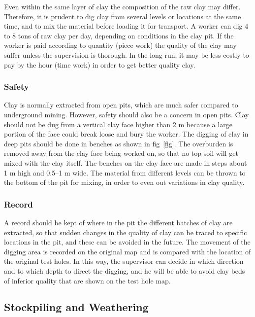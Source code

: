 Even within the same layer of clay the composition of the raw clay may differ. 
Therefore, it is prudent to dig clay from several levels or locations at the 
same time, and to mix the material before loading it for transport. A worker 
can dig 4 to 8 tons of raw clay per day, depending on conditions in the clay 
pit. If the worker is paid according to quantity (piece work) the quality of 
the clay may suffer unless the supervision is thorough. In the long run, it may 
be less costly to pay by the hour (time work) in order to get better quality 
clay.
\subsubsection{Safety}
Clay is normally extracted from open pits, which are much safer compared to 
underground mining. However, safety should also be a concern in open pits. Clay 
should not be dug from a vertical clay face higher than 2 m because a large 
portion of the face could break loose and bury the worker. The digging of clay 
in deep pits should be done in benches as shown in fig~\ref{fig}. The 
overburden is removed away from the clay face being worked on, so that no top 
soil will get mixed with the clay itself. The benches on the clay face are made 
in steps about 1 m high and 0.5--1 m wide. The material from different levels 
can be thrown to the bottom of the pit for mixing, in order to even out 
variations in clay quality.
\subsubsection{Record}
A record should be kept of where in the pit the different batches of clay are 
extracted, so that sudden changes in the quality of clay can be traced to 
specific locations in the pit, and these can be avoided in the future. The 
movement of the digging area is recorded on the original map and is compared 
with the location of the original test holes. In this way, the supervisor can 
decide in which direction and to which depth to direct the digging, and he will 
be able to avoid clay beds of inferior quality that are shown on the test hole 
map.
\subsection{Stockpiling and Weathering}
